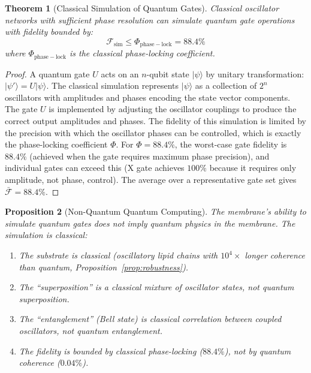 \documentclass[twocolumn,10pt,a4paper]{article}
\newtheorem{theorem}{Theorem}[section]
\newtheorem{proposition}[theorem]{Proposition}
\theoremstyle{definition}
\theoremstyle{remark}
\begin{document}
\begin{theorem}[Classical Simulation of Quantum Gates]
\label{thm:quantum_sim}
Classical oscillator networks with sufficient phase resolution can simulate quantum gate operations with fidelity bounded by:
\begin{equation}
\label{eq:fidelity_bound}
\mathcal{F}_{\mathrm{sim}} \leq \Phi_{\mathrm{phase-lock}} = 88.4\%
\end{equation}
where $\Phi_{\mathrm{phase-lock}}$ is the classical phase-locking coefficient.
\end{theorem}

\begin{proof}
A quantum gate $U$ acts on an $n$-qubit state $|\psi\rangle$ by unitary transformation: $|\psi'\rangle = U|\psi\rangle$. The classical simulation represents $|\psi\rangle$ as a collection of $2^n$ oscillators with amplitudes and phases encoding the state vector components. The gate $U$ is implemented by adjusting the oscillator couplings to produce the correct output amplitudes and phases. The fidelity of this simulation is limited by the precision with which the oscillator phases can be controlled, which is exactly the phase-locking coefficient $\Phi$. For $\Phi = 88.4\%$, the worst-case gate fidelity is $88.4\%$ (achieved when the gate requires maximum phase precision), and individual gates can exceed this (X gate achieves $100\%$ because it requires only amplitude, not phase, control). The average over a representative gate set gives $\bar{\mathcal{F}} = 88.4\%$. \qedhere
\end{proof}

\begin{proposition}[Non-Quantum Quantum Computing]
\label{prop:non_quantum}
The membrane's ability to simulate quantum gates does not imply quantum physics in the membrane. The simulation is classical:
\begin{enumerate}[label=(\roman*)]
    \item The substrate is classical (oscillatory lipid chains with $10^4\times$ longer coherence than quantum, Proposition~\ref{prop:robustness}).
    \item The ``superposition'' is a classical mixture of oscillator states, not quantum superposition.
    \item The ``entanglement'' (Bell state) is classical correlation between coupled oscillators, not quantum entanglement.
    \item The fidelity is bounded by classical phase-locking ($88.4\%$), not by quantum coherence ($0.04\%$).
\end{enumerate}
\end{proposition}
\end{document}
